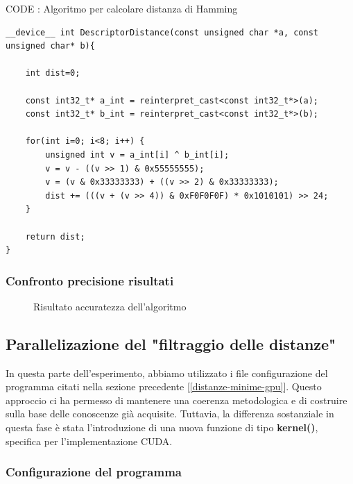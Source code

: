 \documentclass[12pt,a4paper]{report}
\begin{document}
\vspace{2cm}

CODE : Algoritmo per calcolare distanza di Hamming
\begin{lstlisting}
__device__ int DescriptorDistance(const unsigned char *a, const unsigned char* b){

    int dist=0;

    const int32_t* a_int = reinterpret_cast<const int32_t*>(a);
    const int32_t* b_int = reinterpret_cast<const int32_t*>(b);

    for(int i=0; i<8; i++) {
        unsigned int v = a_int[i] ^ b_int[i];
        v = v - ((v >> 1) & 0x55555555);
        v = (v & 0x33333333) + ((v >> 2) & 0x33333333);
        dist += (((v + (v >> 4)) & 0xF0F0F0F) * 0x1010101) >> 24;
    }

    return dist;
}
\end{lstlisting}


\subsubsection{Confronto precisione risultati}

\begin{figure}[H]
    \centering
    \caption{Risultato accuratezza dell'algoritmo}
\end{figure}

\subsection{Parallelizazione del "filtraggio delle distanze" }

In questa parte dell'esperimento, abbiamo utilizzato i file configurazione del programma citati nella sezione precedente [\ref{distanze-minime-gpu}]. Questo approccio ci ha permesso di mantenere una coerenza metodologica e di costruire sulla base delle conoscenze già acquisite. Tuttavia, la differenza sostanziale in questa fase è stata l'introduzione di una nuova funzione di tipo \textbf{kernel()}, specifica per l'implementazione CUDA.
\subsubsection{Configurazione del programma}
\end{document}

